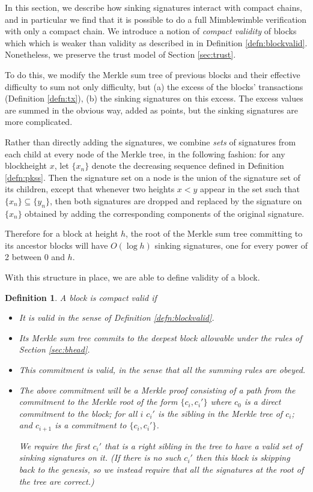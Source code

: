\documentclass[letterpaper]{article}
\newtheorem{defn}{Definition}
\begin{document}
In this section, we describe how sinking signatures interact with compact
chains, and in particular we find that it is possible to do a full
Mimblewimble verification with only a compact chain. We introduce a
notion of \emph{compact validity} of blocks which which is weaker than
validity as described in in Definition \ref{defn:blockvalid}. Nonetheless,
we preserve the trust model of Section \ref{sec:trust}.

To do this, we modify the Merkle sum tree of previous blocks and their
effective difficulty to sum not only difficulty, but (a) the excess of
the blocks' transactions (Definition \ref{defn:tx}), (b) the sinking
signatures on this excess. The excess values are summed in the obvious
way, added as points, but the sinking signatures are more complicated.

Rather than directly adding the signatures, we combine \emph{sets} of
signatures from each child at every node of the Merkle tree, in the
following fashion: for any blockheight $x$, let $\{x_n\}$ denote the
decreasing sequence defined in Definition \ref{defn:pkss}. Then the
signature set on a node is the union of the signature set of its
children, except that whenever two heights $x < y$ appear in the set
such that $\{x_n\}\subseteq\{y_n\}$, then both signatures are dropped
and replaced by the signature on $\{x_n\}$ obtained by adding the
corresponding components of the original signature.

Therefore for a block at height $h$, the root of the Merkle sum tree
committing to its ancestor blocks will have $O(\log h)$ sinking
signatures, one for every power of 2 between 0 and $h$.

With this structure in place, we are able to define validity of a block.
\begin{defn} A block is \emph{compact valid} if
\begin{itemize}
\item It is valid in the sense of Definition \ref{defn:blockvalid}.
\item Its Merkle sum tree commits to the deepest block allowable
under the rules of Section \ref{sec:bhead}.
\item This commitment is valid, in the sense that all the summing
rules are obeyed.
\item The above commitment will be a Merkle proof consisting of a
path from the commitment to the Merkle root of the form $\{ c_i, c_i' \}$
where $c_0$ is a direct commitment to the block; for all $i$ $c_i'$ is
the sibling in the Merkle tree of $c_i$; and $c_{i+1}$ is a commitment
to $\{c_i, c_i'\}$.

We require the first $c_i'$ that is a \emph{right sibling} in the
tree to have a valid set of sinking signatures on it. (If there is
no such $c_i'$ then this block is skipping back to the genesis, so
we instead require that all the signatures at the root of the tree
are correct.)
\end{itemize}\label{defn:compactvalid}
\end{defn}
\end{document}
